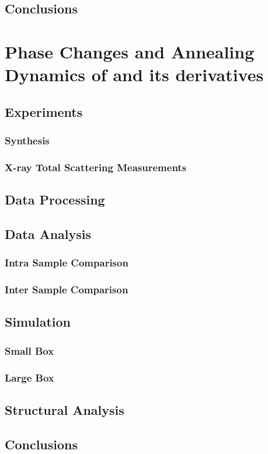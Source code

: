 \documentclass{uscthesis}
\theoremstyle{definition}
\theoremstyle{plain}
\begin{document}
\section{Conclusions}

\chapter{Phase Changes and Annealing Dynamics of  and its derivatives}
\section{Experiments}
\subsection{ Synthesis}
\subsection{X-ray Total Scattering Measurements}
\section{Data Processing}
\section{Data Analysis}
\subsection{Intra Sample Comparison}
\subsection{Inter Sample Comparison}
\section{Simulation}
\subsection{Small Box}
\subsection{Large Box}
\section{Structural Analysis}
\section{Conclusions}
\end{document}
